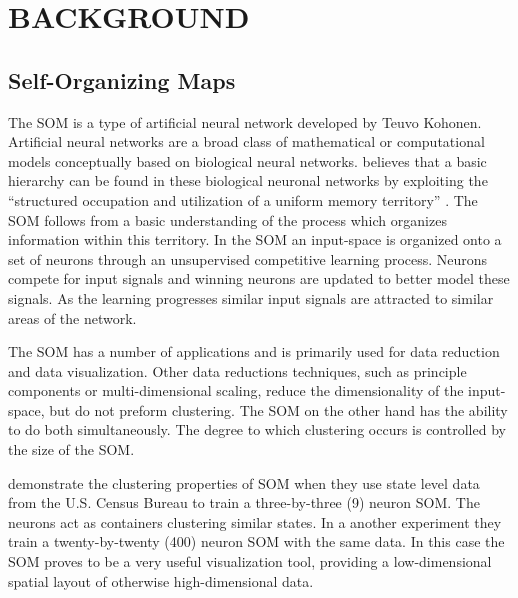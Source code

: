 \chapter{BACKGROUND}


\section{Self-Organizing Maps}
\label{bg:som}
The SOM is a type of artificial neural network developed by Teuvo Kohonen.
Artificial neural networks are a broad class of mathematical or computational
models conceptually based on biological neural networks.  \citep{Kohonen2000}
believes that a basic hierarchy can be found in these biological neuronal
networks by exploiting the ``structured occupation and utilization of a
uniform memory territory'' \cite[p. 102]{Kohonen2000}.  The SOM follows from a
basic understanding of the process which organizes information within this
territory.  In the SOM an input-space is organized onto a set of neurons
through an unsupervised competitive learning process.  Neurons compete for
input signals and winning neurons are updated to better model these signals.
As the learning progresses similar input signals are attracted to similar
areas of the network.

The SOM has a number of applications and is primarily used for data reduction
and data visualization.  Other data reductions techniques, such as principle
components or multi-dimensional scaling, reduce the dimensionality of 
the input-space, but do not preform clustering.  The SOM on the other hand has
the ability to do both simultaneously.  The degree to which clustering occurs
is controlled by the size of the SOM.

\cite{skupin08} demonstrate the clustering properties of SOM when they use
state level data from the U.S. Census Bureau to train a three-by-three (9)
neuron SOM.  The neurons act as containers clustering similar states.  In a
another experiment they train a twenty-by-twenty (400) neuron SOM with the same
data.  In this case the SOM proves to be a very useful visualization tool,
providing a low-dimensional spatial layout of otherwise high-dimensional data.

